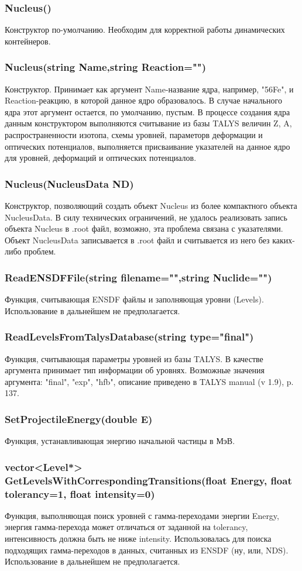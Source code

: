 \documentclass[a4paper,12pt]{extarticle}
\begin{document}
\subsubsection{Nucleus()}
Конструктор по-умолчанию. Необходим для корректной работы динамических контейнеров.
\subsubsection{Nucleus(string Name,string Reaction=\textbf{""})}
Конструктор. Принимает как аргумент Name-название ядра, например, "56Fe",  и Reaction-реакцию, в которой данное ядро образовалось. В случае начального ядра этот аргумент остается, по умолчанию, пустым. В процессе создания ядра данным конструктором выполняются считывание из базы TALYS величин Z, A, распространенности изотопа, схемы уровней, параметорв деформации и оптических потенциалов, выполняется присваивание указателей на данное ядро для уровней, деформаций и оптических потенциалов.
\subsubsection{Nucleus(NucleusData ND)}
Конструктор, позволяющий создать объект Nucleus из более компактного объекта NucleusData. В силу технических ограничений, не удалось реализовать запись объекта Nucleus в .root файл, возможно, эта проблема связана с указателями. Объект NucleusData записывается в .root файл и считывается из него без каких-либо проблем.
\subsubsection{ReadENSDFFile(string filename="",string Nuclide="")}
Функция, считывающая ENSDF файлы и заполняющая уровни (Levels). Использование в дальнейшем не предполагается.
\subsubsection{ReadLevelsFromTalysDatabase(string type="final")}
Функция, считывающая параметры уровней из базы TALYS. В качестве аргумента принимает тип информации об уровнях. Возможные значения аргумента: "final", "exp", "hfb", описание приведено в TALYS manual (v 1.9), p. 137.
\subsubsection{SetProjectileEnergy(double E)}
Функция, устанавливающая энергию начальной частицы в МэВ.
\subsubsection{vector<Level*> GetLevelsWithCorrespondingTransitions(float Energy, float tolerancy=1, float intensity=0)}
Функция, выполняющая поиск уровней с гамма-переходами энергии Energy, энергия гамма-перехода может отличаться от заданной на tolerancy, интенсивность должна быть не ниже intensity. Использовалась для поиска подходящих гамма-переходов в данных, считанных из ENSDF (ну, или, NDS). Использование в дальнейшем не предполагается.
\end{document}
